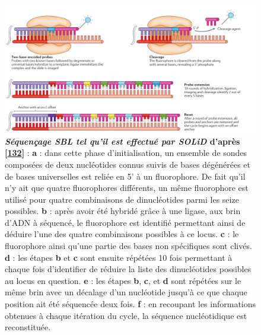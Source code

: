 \documentclass[12pt,a4paper,twoside]{ugathesis}
\theoremstyle{definition}
\theoremstyle{definition}
\theoremstyle{definition}
\theoremstyle{remark}
\begin{document}
\begin{figure}

{\centering \includegraphics[scale=.26]{figure/SBL_seq_solid} 

}

\caption[Séquençage SBL tel qu'il est effectué par SOLiD]{\textbf{\emph{Séquençage SBL tel qu'il est effectué par
SOLiD} d'après {[}\protect\hyperlink{ref-Goodwin2016}{132}{]}} :
\textbf{a} : dans cette phase d'initialisation, un ensemble de sondes
composées de deux nucléotides connus suivis de bases dégénérées et de
bases universelles est reliée en 5' à un fluorophore. De fait qu'il n'y
ait que quatre fluorophores différents, un même fluorophore est utilisé
pour quatre combinaisons de dinucléotides parmi les seize possibles.
\textbf{b} : après avoir été hybridé grâce à une ligase, aux brin d'ADN
à séquencé, le fluorophore est identifié permettant ainsi de déduire
l'une des quatre combinaisons possibles à ce locus. \textbf{c} : le
fluorophore ainsi qu'une partie des bases non spécifiques sont clivés.
\textbf{d} : les étapes \textbf{b} et \textbf{c} sont ensuite répétées
10 fois permettant à chaque fois d'identifier de réduire la liste des
dinucléotides possibles au locus en question. \textbf{e} : les étapes
\textbf{b}, \textbf{c}, et \textbf{d} sont répétées sur le même brin
avec un décalage d'un nucléotide jusqu'à ce que chaque position ait été
séquencée deux fois. \textbf{f} : en recoupant les informations obtenues
à chaque itération du cycle, la séquence nucléotidique est reconstituée.}\label{fig:pictsblSeq}
\end{figure}
\end{document}
